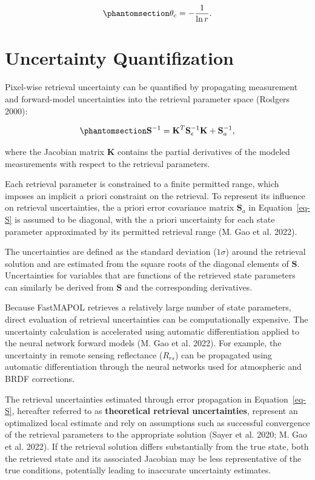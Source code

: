 \documentclass[
  letterpaper,
  open=any]{scrbook}
\begin{document}
\begin{equation}\phantomsection\label{eq-thetac2r}{
\theta_c
=
-\frac{1}{\ln r}.
}\end{equation}

\section{Uncertainty Quantifization}\label{uncertainty-quantifization}

Pixel-wise retrieval uncertainty can be quantified by propagating
measurement and forward-model uncertainties into the retrieval parameter
space (Rodgers 2000):

\begin{equation}\phantomsection\label{eq-S}{
\mathbf{S}^{-1}
=
\mathbf{K}^{T}
\mathbf{S}_{\epsilon}^{-1}
\mathbf{K}
+
\mathbf{S}_{a}^{-1},
}\end{equation}

where the Jacobian matrix \(\mathbf{K}\) contains the partial
derivatives of the modeled measurements with respect to the retrieval
parameters.

Each retrieval parameter is constrained to a finite permitted range,
which imposes an implicit a priori constraint on the retrieval. To
represent its influence on retrieval uncertainties, the a priori error
covariance matrix \(\mathbf{S}_a\) in Equation~\ref{eq-S} is assumed to
be diagonal, with the a priori uncertainty for each state parameter
approximated by its permitted retrieval range (M. Gao et al. 2022).

The uncertainties are defined as the standard deviation (\(1\sigma\))
around the retrieval solution and are estimated from the square roots of
the diagonal elements of \(\mathbf{S}\). Uncertainties for variables
that are functions of the retrieved state parameters can similarly be
derived from \(\mathbf{S}\) and the corresponding derivatives.

Because FastMAPOL retrieves a relatively large number of state
parameters, direct evaluation of retrieval uncertainties can be
computationally expensive. The uncertainty calculation is accelerated
using automatic differentiation applied to the neural network forward
models (M. Gao et al. 2022). For example, the uncertainty in remote
sensing reflectance (\(R_{rs}\)) can be propagated using automatic
differentiation through the neural networks used for atmospheric and
BRDF corrections.

The retrieval uncertainties estimated through error propagation in
Equation~\ref{eq-S}, hereafter referred to as \textbf{theoretical
retrieval uncertainties}, represent an optimalized local estimate and
rely on assumptions such as successful convergence of the retrieval
parameters to the appropriate solution (Sayer et al. 2020; M. Gao et al.
2022). If the retrieval solution differs substantially from the true
state, both the retrieved state and its associated Jacobian may be less
representative of the true conditions, potentially leading to inaccurate
uncertainty estimates.
\end{document}
